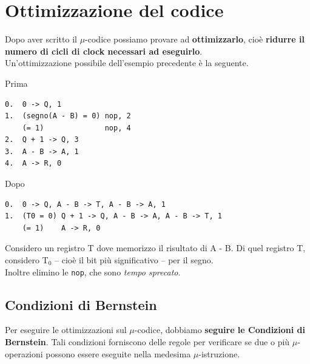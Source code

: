 \documentclass[10pt]{report}
\begin{document}
\section{Ottimizzazione del codice}
Dopo aver scritto il $\mu$-codice possiamo provare ad \textbf{ottimizzarlo}, cioè \textbf{ridurre il numero di cicli di clock necessari ad eseguirlo}.\\
Un'ottimizzazione possibile dell'esempio precedente è la seguente.
\begin{multicols}{2}
\begin{center}
Prima
\begin{lstlisting}
0.  0 -> Q, 1
1.  (segno(A - B) = 0) nop, 2
    (= 1)              nop, 4
2.  Q + 1 -> Q, 3
3.  A - B -> A, 1
4.  A -> R, 0
\end{lstlisting}
\end{center}
\columnbreak
\begin{center}
Dopo
\begin{lstlisting}
0.  0 -> Q, A - B -> T, A - B -> A, 1
1.  (T0 = 0) Q + 1 -> Q, A - B -> A, A - B -> T, 1
    (= 1)    A -> R, 0
\end{lstlisting}
\end{center}
\end{multicols}
Considero un registro T dove memorizzo il risultato di A - B. Di quel registro T, considero T$_0$ -- cioè il bit più significativo -- per il segno.\\
Inoltre elimino le \texttt{nop}, che sono \textit{tempo sprecato}.
\subsection{Condizioni di Bernstein}
Per eseguire le ottimizzazioni sul $\mu$-codice, dobbiamo \textbf{seguire le Condizioni di Bernstein}. Tali condizioni forniscono delle regole per verificare se due o più $\mu$-operazioni possono essere eseguite nella medesima $\mu$-istruzione.
\end{document}

